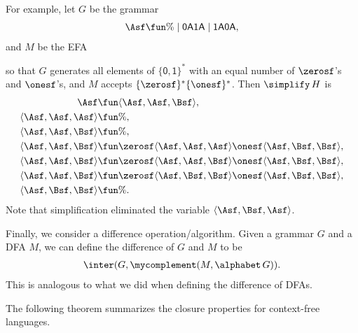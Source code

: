 For example, let $G$ be the grammar
\begin{gather*}
  \Asf \fun \% \mid \mathsf{0A1A} \mid \mathsf{1A0A} ,
\end{gather*}
and $M$ be the EFA
\begin{center}
  
\end{center}
so that $G$ generates all elements of $\{\mathsf{0,1}\}^*$
with an equal number of $\zerosf$'s and $\onesf$'s, and $M$
accepts $\{\zerosf\}^*\{\onesf\}^*$.
Then $\simplify\,H$ is
\begin{align*}
\Asf &\fun \langle\Asf,\Asf,\Bsf\rangle , \\
\langle\Asf,\Asf,\Asf\rangle &\fun \% , \\
\langle\Asf,\Asf,\Bsf\rangle &\fun \% , \\
\langle\Asf,\Asf,\Bsf\rangle &\fun
\zerosf\langle\Asf,\Asf,\Asf\rangle\onesf\langle\Asf,\Bsf,\Bsf\rangle , \\
\langle\Asf,\Asf,\Bsf\rangle &\fun
\zerosf\langle\Asf,\Asf,\Bsf\rangle\onesf\langle\Asf,\Bsf,\Bsf\rangle , \\
\langle\Asf,\Asf,\Bsf\rangle &\fun
\zerosf\langle\Asf,\Bsf,\Bsf\rangle\onesf\langle\Asf,\Bsf,\Bsf\rangle , \\
\langle\Asf,\Bsf,\Bsf\rangle &\fun \% .
\end{align*}
Note that simplification eliminated the variable
$\langle\Asf,\Bsf,\Asf\rangle$.

Finally, we consider a difference operation/algorithm.
Given a grammar $G$ and a DFA $M$, we can define the difference of
$G$ and $M$ to be
\begin{gather*}
\inter(G, \mycomplement(M, \alphabet\,G)) .
\end{gather*}
This is analogous to what we did when defining the difference of
DFAs.

The following theorem summarizes the closure properties for context-free
languages.

